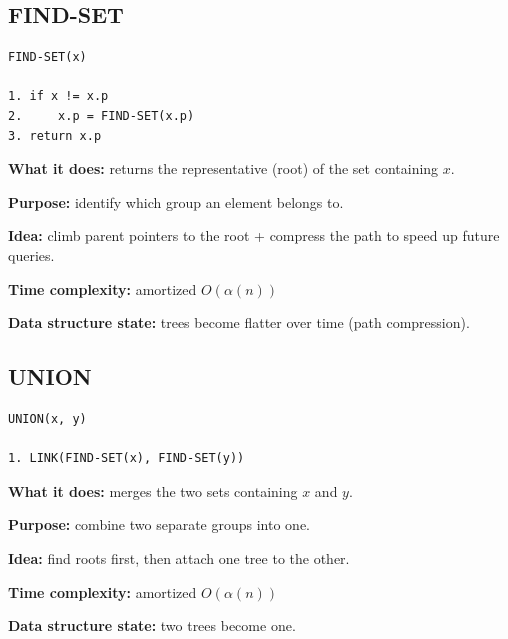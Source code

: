 \documentclass[11pt,a4paper,openany]{book}
\begin{document}
\subsection{FIND-SET}



\begin{lstlisting}
FIND-SET(x)

1. if x != x.p
2.     x.p = FIND-SET(x.p)
3. return x.p
\end{lstlisting}

\textbf{What it does:} returns the representative (root) of the set containing $x$.

\textbf{Purpose:} identify which group an element belongs to.

\textbf{Idea:} climb parent pointers to the root + compress the path to speed up future queries.

\textbf{Time complexity:} amortized $O(\alpha(n))$

\textbf{Data structure state:} trees become flatter over time (path compression).






\vspace{2cm}





\subsection{UNION}



\begin{lstlisting}
UNION(x, y)

1. LINK(FIND-SET(x), FIND-SET(y))
\end{lstlisting}

\textbf{What it does:} merges the two sets containing $x$ and $y$.

\textbf{Purpose:} combine two separate groups into one.

\textbf{Idea:} find roots first, then attach one tree to the other.

\textbf{Time complexity:} amortized $O(\alpha(n))$

\textbf{Data structure state:} two trees become one.





\vspace{2cm}
\end{document}
